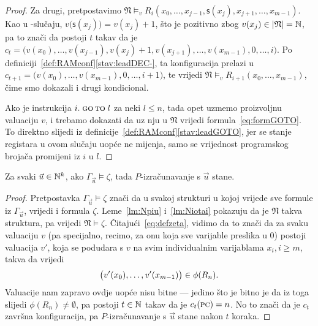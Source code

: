 \begin{proof}
Za drugi, pretpostavimo $\mathfrak N\models_v R_i(x_0,\dotsc,x_{j-1},\mathsf s(x_j),x_{j+1},\dotsc,x_{m-1})$. Kao u \inc-slučaju, $v\bigl(\mathsf s(x_j)\bigr)=v(x_j)+1$, što je pozitivno zbog $v(x_j)\in\lvert\mathfrak N\rvert={\mathbb N}$, pa to znači da postoji $t$ takav da je $c_t=\bigl(v(x_0),\dotsc,v(x_{j-1}),v(x_j)+1,v(x_{j+1}),\dotsc,v(x_{m-1}),0,\dotsc,i\bigr)$. Po definiciji~\ref{def:RAMconf}\eqref{stav:leadDEC-}, ta konfiguracija prelazi u $c_{t+1}=\bigl(v(x_0),\dotsc,v(x_{m-1}),0,\dotsc,i+1\bigr)$, te vrijedi $\mathfrak N\models_v R_{i+1}(x_0,\dotsc,x_{m-1})$, čime smo dokazali i drugi kondicional.

Ako je instrukcija $i.\;\textsc{go\,to}\;l$ za neki $l\le n$, tada opet uzmemo proizvoljnu valuaciju $v$, i trebamo dokazati da uz nju u $\mathfrak N$ vrijedi formula~\eqref{eq:formGOTO}. To direktno slijedi iz definicije~\ref{def:RAMconf}\eqref{stav:leadGOTO}, jer se stanje registara u ovom slučaju uopće ne mijenja, samo se vrijednost programskog brojača promijeni iz $i$ u $l$.
\end{proof}

\begin{propozicija}[{name=[zaključivanje povlači zaustavljanje]}]\label{pp:models>stop}
Za svaki $\vec u\in{\mathbb N}^k$, ako $\Gamma_{\vec u}\models\zeta$, tada $P$-izračunavanje s $\vec u$ stane.
\end{propozicija}
\begin{proof}
Pretpostavka $\Gamma_{\vec u}\models\zeta$ znači da u svakoj strukturi u kojoj vrijede sve formule iz $\Gamma_{\vec u}$, vrijedi i formula $\zeta$. Leme~\ref{lm:Npiu} i~\ref{lm:Niotai} pokazuju da je $\mathfrak N$ takva struktura, pa vrijedi $\mathfrak N\models\zeta$. Čitajući~\eqref{eq:defzeta}, vidimo da to znači da za svaku valuaciju $v$ (pa specijalno, recimo, za onu koja sve varijable preslika u $0$) postoji valuacija $v'$, koja se podudara s $v$ na svim individualnim varijablama $x_i,i\ge m$, takva da vrijedi
\begin{equation}
    \bigl(v'(x_0),\dotsc,v'(x_{m-1})\bigr)\in\phi(R_n)\text.
\end{equation}
Valuacije nam zapravo ovdje uopće nisu bitne --- jedino što je bitno je da iz toga slijedi $\phi(R_n)\ne\emptyset$, pa postoji $t\in{\mathbb N}$ takav da je $c_t(\textsc{pc})=n$. No to znači da je $c_t$ završna konfiguracija, pa $P$-izračunavanje s $\vec u$ stane nakon $t$ koraka.
\end{proof}


